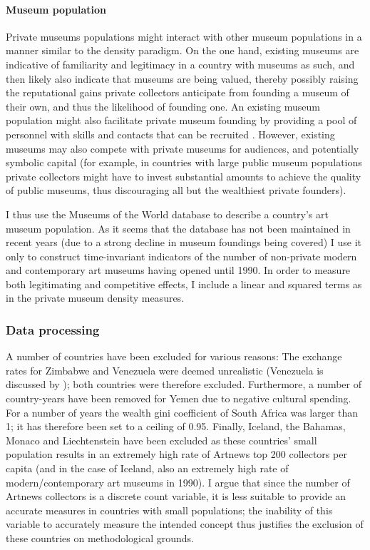 \documentclass[11pt]{article}
\begin{document}
\paragraph*{Museum population}


Private museums populations might interact with other museum populations in a manner similar to the density paradigm. 
On the one hand, existing museums are indicative of familiarity and legitimacy in a country with museums as such, and then likely also indicate that museums are being valued, thereby possibly raising the reputational gains private collectors anticipate from founding a museum of their own, and thus the likelihood of founding one.
An existing museum population might also facilitate private museum founding by providing a pool of personnel with skills and contacts that can be recruited \parencite{Quemin_2020_power}.
However, existing museums may also compete with private museums for audiences, and potentially symbolic capital (for example, in countries with large public museum populations private collectors might have to invest substantial amounts to achieve the quality of public museums, thus discouraging all but the wealthiest private founders). 


I thus use the Museums of the World database \parencite{deGruyter_2021_MOW} to describe a country's art museum population. 
As it seems that the database has not been maintained in recent years (due to a strong decline in museum foundings being covered) I use it only to construct time-invariant indicators of the number of non-private modern and contemporary art museums having opened until 1990.
In order to measure both legitimating and competitive effects, I include a linear and squared terms as in the private museum density measures.


\subsubsection*{Data processing}

A number of countries have been excluded for various reasons:
The exchange rates for Zimbabwe and Venezuela were deemed unrealistic (Venezuela is discussed by \textcite{Blanchet_2017_conversions}); both countries were therefore excluded.
Furthermore, a number of country-years have been removed for Yemen due to negative cultural spending.
For a number of years the wealth gini coefficient of South Africa was larger than 1; it has therefore been set to a ceiling of 0.95.
Finally, Iceland, the Bahamas, Monaco and Liechtenstein have been excluded as these countries' small population results in an extremely high rate of Artnews top 200 collectors per capita (and in the case of Iceland, also an extremely high rate of modern/contemporary art museums in 1990).
I argue that since the number of Artnews collectors is a discrete count variable, it is less suitable to provide an accurate measures in countries with small populations; the inability of this variable to  accurately measure the intended concept thus justifies the exclusion of these countries on methodological grounds.
\end{document}
